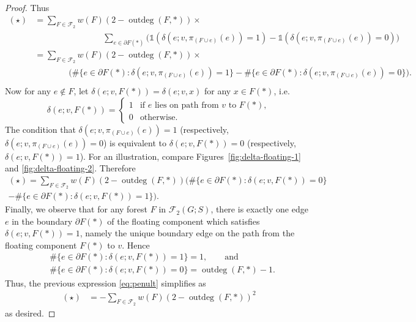 \documentclass[12pt]{amsart}
\theoremstyle{definition}
\newcommand{\one}{\mathds{1}}
\newcommand{\forests}{\mathcal{F}}
\DeclareMathOperator{\outdeg}{outdeg}
\begin{document}
\begin{proof}
Thus
\begin{align*}
	(\star) 
	&= \sum_{F \in \forests_2} w({F}) (2 - \outdeg(F, *)) \times \\
	& \qquad \qquad \qquad \qquad   \sum_{e \in \partial F(*)} \Big( \one(\delta(e; v, \pi_{(F \cup e)}(e)) = 1) - \one(\delta(e; v, \pi_{(F \cup e)}(e)) = 0) \Big) \\
	&= \sum_{F \in \forests_2} w({F}) (2 - \outdeg(F,*)) \times \\
	& \qquad\qquad \Bigg( \#\{e \in \partial F(*) \colon \delta(e; v, \pi_{(F \cup e)}(e)) = 1\} - \#\{e \in \partial F(*) \colon \delta(e; v, \pi_{(F \cup e)}(e)) = 0\} \Bigg). \\
\end{align*}
Now for any $e \not\in F$, let $\delta(e; v, F(*)) = \delta(e; v, x)$ for any $x \in F(*)$, i.e.
\[
	\delta(e; v, F(*)) = \begin{cases}
	1 &\text{if $e$ lies on path from $v$ to $F(*)$}, \\
	0 &\text{otherwise}.
	\end{cases}
\]
The condition that $\delta(e; v, \pi_{(F \cup e)}(e)) = 1$ (respectively, $\delta(e; v, \pi_{(F \cup e)}(e)) = 0$)
is equivalent to ${\delta(e; v, F(*)) = 0}$ (respectively, ${\delta(e; v, F(*)) = 1}$).
For an illustration, compare Figures~\ref{fig:delta-floating-1} and \ref{fig:delta-floating-2}.
Therefore
\begin{multline}\label{eq:penult}
	(\star) = \sum_{F \in \forests_2} w({F}) (2 - \outdeg(F,*))  \Bigg( \#\{e \in \partial F(*) \colon \delta(e; v, F(*)) = 0 \}  \\
	- \#\{e \in \partial F(*) \colon \delta(e; v, F(*)) = 1 \}  \Bigg).
\end{multline}
Finally, we observe that for any forest $F$ in $\forests_2(G;S)$,
there is exactly one edge $e$ in the boundary $\partial F(*)$ of the floating component which satisfies $\delta(e; v, F(*)) = 1$, namely the unique boundary edge on the path from the floating component $F(*)$ to $v$.
Hence
\begin{align*}
	&\#\{e \in \partial F(*) \colon \delta(e;v, F(*)) = 1 \} = 1,
\qquad\text{and}\qquad \\
	&\#\{e \in \partial F(*) \colon \delta(e;v, F(*)) = 0 \} = \outdeg(F,*) - 1 .
\end{align*}
Thus, the previous expression \eqref{eq:penult} simplifies as
\begin{align*}
	(\star) 
	&= - \!\sum_{F \in \forests_2} w({F}) (2 - \outdeg(F,*))^2 
\end{align*}
as desired.
\end{proof}
\end{document}

